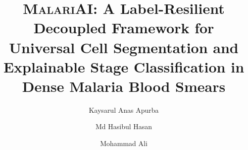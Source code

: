 \documentclass[review,12pt]{elsarticle}
\newcommand{\malariai}{\textsc{MalariAI}}
\begin{document}
\begin{frontmatter}

\title{\malariai: A Label-Resilient Decoupled Framework for Universal
  Cell Segmentation and Explainable Stage Classification in Dense Malaria
  Blood Smears}

\author[1]{Kaysarul Anas Apurba}

\author[1]{Md Hasibul Hasan}

\author[2]{Mohammad Ali}

\address[1]{Independent Researcher, Dhaka, Bangladesh}
\address[1]{Independent Researcher, Dhaka, Bangladesh}



\end{frontmatter}
\end{document}
